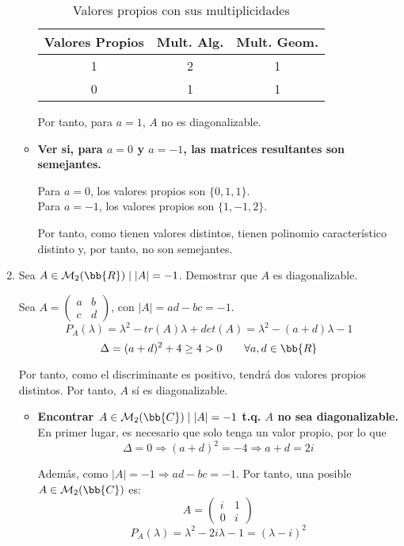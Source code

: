 \begin{ejercicio}
\begin{enumerate}
\begin{itemize}
\begin{table}[H]
            \centering
            \begin{tabular}{c|c|c}
                Valores Propios & Mult. Alg. & Mult. Geom. \\ \hline 
                1 & 2 & 1\\
                0 & 1 & 1\\
            \end{tabular}
            \caption{Valores propios con sus multiplicidades}
        \end{table}
        Por tanto, para $a=1$, $A$ no es diagonalizable.
    \end{itemize}

    \begin{itemize}
        \item \textbf{Ver si, para $a=0$ y $a=-1$, las matrices resultantes son semejantes.}
        
        Para $a=0$, los valores propios son $\{0,1,1\}$.\\
        Para $a=-1$, los valores propios son $\{1,-1,2\}$.

        Por tanto, como tienen valores distintos, tienen polinomio característico distinto y, por tanto, no son semejantes.
    \end{itemize}

    \item Sea $A\in\mathcal{M}_2(\bb{R}) \mid |A|=-1$. Demostrar que $A$ es diagonalizable.

    Sea $A=\left( \begin{array}{cc}
        a & b \\
        c & d
    \end{array} \right)$, con $|A|=ad-bc = -1$.
    $$P_A(\lambda) = \lambda^2 - tr(A)\lambda + det(A) = \lambda^2 -(a+d)\lambda-1$$
    $$\Delta = (a+d)^2 +4 \geq 4 > 0 \qquad \forall a,d \in \bb{R}$$

    Por tanto, como el discriminante es positivo, tendrá dos valores propios distintos. Por tanto, $A$ sí es diagonalizable.

    \begin{itemize}
        \item \textbf{Encontrar $A\in\mathcal{M}_2(\bb{C}) \mid |A|=-1$ t.q. $A$ no sea diagonalizable.}\\
        En primer lugar, es necesario que solo tenga un valor propio, por lo que $$\Delta=0 \Longrightarrow (a+d)^2 = -4 \Longrightarrow a+d = 2i$$

        Además, como $|A|=-1 \Longrightarrow ad-bc=-1$. Por tanto, una posible $A\in\mathcal{M}_2(\bb{C})$ es: $$A=\left( \begin{array}{cc}
            i & 1 \\
            0 & i
        \end{array} \right)$$
        $$P_A(\lambda) = \lambda^2-2i\lambda-1 = (\lambda-i)^2$$


\end{itemize}
\end{enumerate}
\end{ejercicio}
